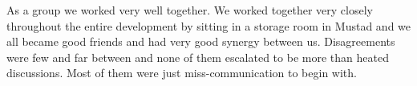 As a group we worked very well together.
We worked together very closely throughout the entire development by sitting in a storage room in Mustad and we all became good friends and had very good synergy between us.
Disagreements were few and far between and none of them escalated to be more than heated discussions. Most of them were just miss-communication to begin with. 


